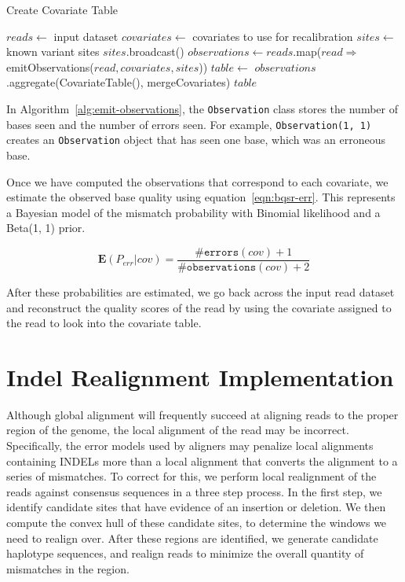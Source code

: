 \documentclass[phd]{ucbthesis}
\begin{document}
\begin{algorithm}
\caption{Create Covariate Table}
\label{alg:create-table}
\begin{algorithmic}
\STATE $reads \leftarrow$ input dataset
\STATE $covariates \leftarrow$ covariates to use for recalibration
\STATE $sites \leftarrow$ known variant sites
\STATE $sites$.broadcast()
\STATE $observations \leftarrow reads$.map($read \Rightarrow$ emitObservations($read, covariates, sites$))
\STATE $table \leftarrow$ $observations$.aggregate(CovariateTable(), mergeCovariates)
\RETURN $table$
\end{algorithmic}
\end{algorithm}

In Algorithm~\ref{alg:emit-observations}, the \texttt{Observation} class stores the number of bases seen
and the number of errors seen. For example, \texttt{Observation(1, 1)} creates an \texttt{Observation} object
that has seen one base, which was an erroneous base.

Once we have computed the observations that correspond to each covariate, we estimate the observed base
quality using equation~\eqref{eqn:bqsr-err}. This represents a Bayesian model of the mismatch probability with
Binomial likelihood and a Beta(1, 1) prior.

\begin{equation}
\label{eqn:bqsr-err}
\mathbf{E}(P_{err}|{cov}) = \frac{\texttt{\#errors}(cov) + 1}{\texttt{\#observations}(cov) + 2}
\end{equation}

After these probabilities are estimated, we go back across the input read dataset and reconstruct the quality
scores of the read by using the covariate assigned to the read to look into the covariate table.

\section{Indel Realignment Implementation}
\label{sec:indel-realignment-implementation}

Although global alignment will frequently succeed at aligning reads to the proper region of the genome, the local
alignment of the read may be incorrect. Specifically, the error models used by aligners may penalize local alignments
containing INDELs more than a local alignment that converts the alignment to a series of mismatches. To correct
for this, we perform local realignment of the reads against consensus sequences in a three step
process. In the first step, we identify candidate sites that have evidence of an insertion or deletion. We then compute
the convex hull of these candidate sites, to determine the windows we need to realign over. After these regions are
identified, we generate candidate haplotype sequences, and realign reads to minimize the overall quantity of mismatches
in the region.
\end{document}
